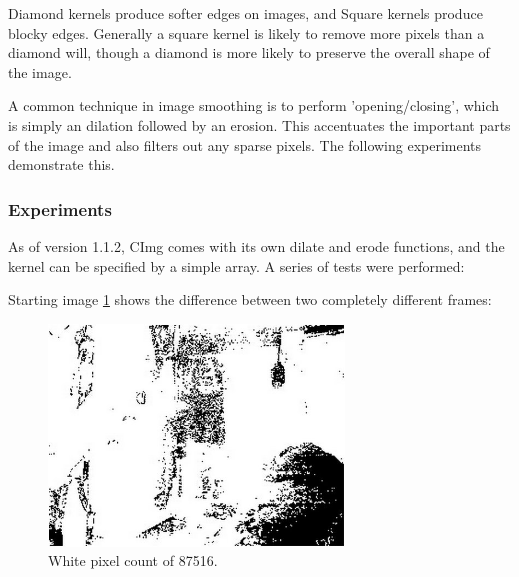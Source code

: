 {{Diamond kernels produce softer edges on images, and Square kernels produce blocky edges. Generally a square kernel is likely to remove more pixels than a diamond will, though a diamond is more likely to preserve the overall shape of the image.

A common technique in image smoothing is to perform 'opening/closing', which is simply an dilation followed by an erosion. This accentuates the important parts of the image and also filters out any sparse pixels. The following experiments demonstrate this.

\subsubsection{Experiments}
As of version 1.1.2, CImg comes with its own dilate and erode functions, and the kernel can be specified by a simple array. A series of tests were performed:

Starting image \cref{img:uneditsub1} shows the difference between two  completely different frames:
\begin{figure}[H]
	\vspace{50pt}
	\centering
	\includegraphics[width=0.7\textwidth]{../images/ImageOps/uneditedsub}
	\caption{White pixel count of 87516.}
	\label{img:uneditsub1}
\end{figure}

}}
